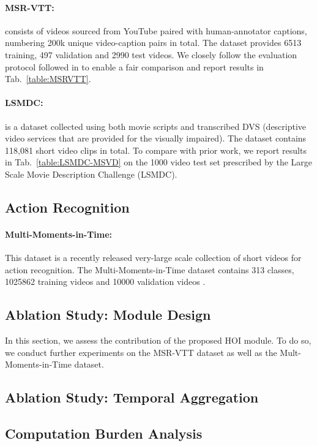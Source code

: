 

\paragraph{MSR-VTT:} \cite{xu2016msr} consists of videos sourced from YouTube paired with human-annotator captions, numbering 200k unique video-caption pairs in total. The dataset provides 6513 training, 497 validation and 2990 test videos.    We closely follow the evaluation protocol followed in \cite{liu2019use} to enable a fair comparison and report results in Tab.~\ref{table:MSRVTT}. 



\paragraph{LSMDC:} \cite{rohrbach2015dataset} is a dataset collected using both movie scripts and transcribed DVS (descriptive video services that are provided for the visually impaired).  The dataset contains 118,081 short video clips in total. To compare with prior work, we report results in Tab.~\ref{table:LSMDC-MSVD}  on the 1000 video test set prescribed by the Large Scale Movie Description Challenge (LSMDC).




\subsection{Action Recognition}

\paragraph{Multi-Moments-in-Time:} This dataset is a recently released very-large scale collection of short videos for action recognition.  The Multi-Moments-in-Time dataset contains 313 classes, 1025862 training videos and 10000 validation videos \cite{monfortmoments}.

\subsection{Ablation Study: Module Design}

In this section, we assess the contribution of the proposed HOI module.  To do so, we conduct further experiments on the MSR-VTT dataset as well as the Mult-Moments-in-Time dataset.

\subsection{Ablation Study: Temporal Aggregation}

\subsection{Computation Burden Analysis}